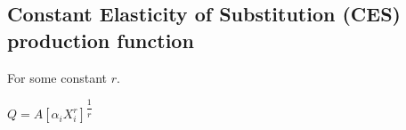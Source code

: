 
\subsection{Constant Elasticity of Substitution (CES) production function}

For some constant \(r\).

\(Q=A[\alpha_i X_i^r]^{\dfrac{1}{r}}\)

